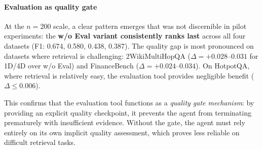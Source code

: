 \begin{table}[t]
\centering
\caption{Evaluation tool ablation (RQ3, $n = 200$). The w/o Eval variant consistently underperforms variants with evaluation, confirming the evaluation tool's role as a quality gate. 1D and 4D perform comparably, with 1D marginally ahead on 3/4 datasets. Best per dataset in \textbf{bold}.}
\label{tab:rq3}
\end{table}

\paragraph{Evaluation as quality gate}
At the $n = 200$ scale, a clear pattern emerges that was not discernible in pilot experiments: the \textbf{w/o Eval variant consistently ranks last} across all four datasets (F1: 0.674, 0.580, 0.438, 0.387).
The quality gap is most pronounced on datasets where retrieval is challenging: 2WikiMultiHopQA ($\Delta = +0.028$--$0.031$ for 1D/4D over w/o Eval) and FinanceBench ($\Delta = +0.024$--$0.034$).
On HotpotQA, where retrieval is relatively easy, the evaluation tool provides negligible benefit ($\Delta \leq 0.006$).

This confirms that the evaluation tool functions as a \emph{quality gate mechanism}: by providing an explicit quality checkpoint, it prevents the agent from terminating prematurely with insufficient evidence.
Without the gate, the agent must rely entirely on its own implicit quality assessment, which proves less reliable on difficult retrieval tasks.

